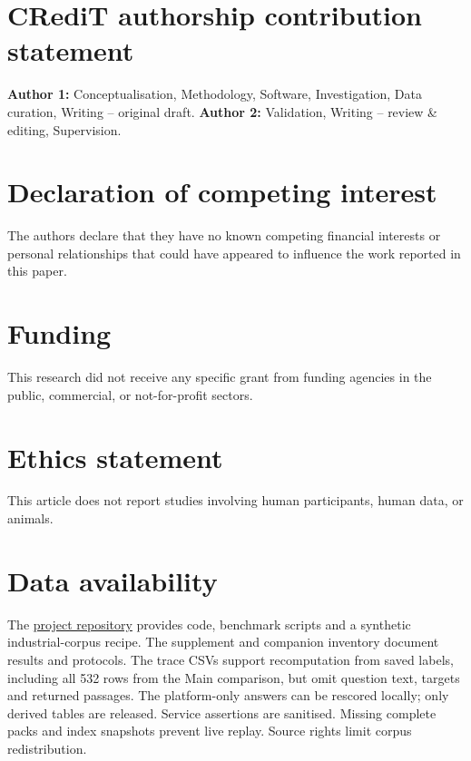 
\section*{CRediT authorship contribution statement}
\textbf{Author 1:} Conceptualisation, Methodology, Software, Investigation,
Data curation, Writing -- original draft. \textbf{Author 2:} Validation,
Writing -- review \& editing, Supervision. %

\section*{Declaration of competing interest}
The authors declare that they have no known competing financial interests
or personal relationships that could have appeared to influence the work
reported in this paper.

\section*{Funding}
This research did not receive any specific grant from funding agencies in
the public, commercial, or not-for-profit sectors. %

\section*{Ethics statement}
This article does not report studies involving human participants, human
data, or animals.

\section*{Data availability}
The \href{https://github.com/kingdol666/rag-knowledge}{project repository}
provides code, benchmark scripts and a synthetic industrial-corpus recipe.
The supplement and companion inventory document results and protocols. The
trace CSVs support recomputation from saved labels, including all 532 rows
from the Main comparison, but omit question text, targets and returned
passages. The platform-only answers can be rescored locally; only derived
tables are released. Service assertions are sanitised. Missing complete
packs and index snapshots prevent live replay. Source rights limit corpus
redistribution.

